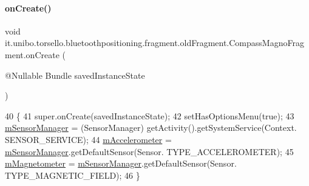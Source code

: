 \paragraph{\texorpdfstring{on\+Create()}{onCreate()}}
{\footnotesize\ttfamily void it.\+unibo.\+torsello.\+bluetoothpositioning.\+fragment.\+old\+Fragment.\+Compass\+Magno\+Fragment.\+on\+Create (\begin{DoxyParamCaption}\item[{@Nullable Bundle}]{saved\+Instance\+State }\end{DoxyParamCaption})}


\begin{DoxyCode}
40                                                               \{
41         super.onCreate(savedInstanceState);
42         setHasOptionsMenu(\textcolor{keyword}{true});
43         \hyperlink{classit_1_1unibo_1_1torsello_1_1bluetoothpositioning_1_1fragment_1_1oldFragment_1_1CompassMagnoFragment_ae6b91ce34c58940e5f936dba964d6182_ae6b91ce34c58940e5f936dba964d6182}{mSensorManager} = (SensorManager) getActivity().getSystemService(Context.
      SENSOR\_SERVICE);
44         \hyperlink{classit_1_1unibo_1_1torsello_1_1bluetoothpositioning_1_1fragment_1_1oldFragment_1_1CompassMagnoFragment_ae5b2153973fd62a9142fa372461808c5_ae5b2153973fd62a9142fa372461808c5}{mAccelerometer} = \hyperlink{classit_1_1unibo_1_1torsello_1_1bluetoothpositioning_1_1fragment_1_1oldFragment_1_1CompassMagnoFragment_ae6b91ce34c58940e5f936dba964d6182_ae6b91ce34c58940e5f936dba964d6182}{mSensorManager}.getDefaultSensor(Sensor.
      TYPE\_ACCELEROMETER);
45         \hyperlink{classit_1_1unibo_1_1torsello_1_1bluetoothpositioning_1_1fragment_1_1oldFragment_1_1CompassMagnoFragment_a7ff1cf69c59de3ce3b93de90501d1848_a7ff1cf69c59de3ce3b93de90501d1848}{mMagnetometer} = \hyperlink{classit_1_1unibo_1_1torsello_1_1bluetoothpositioning_1_1fragment_1_1oldFragment_1_1CompassMagnoFragment_ae6b91ce34c58940e5f936dba964d6182_ae6b91ce34c58940e5f936dba964d6182}{mSensorManager}.getDefaultSensor(Sensor.
      TYPE\_MAGNETIC\_FIELD);
46     \}
\end{DoxyCode}
\hypertarget{classit_1_1unibo_1_1torsello_1_1bluetoothpositioning_1_1fragment_1_1oldFragment_1_1CompassMagnoFragment_a3ea35cb229abc119708ab9b559781f45_a3ea35cb229abc119708ab9b559781f45}{}\label{classit_1_1unibo_1_1torsello_1_1bluetoothpositioning_1_1fragment_1_1oldFragment_1_1CompassMagnoFragment_a3ea35cb229abc119708ab9b559781f45_a3ea35cb229abc119708ab9b559781f45} 
